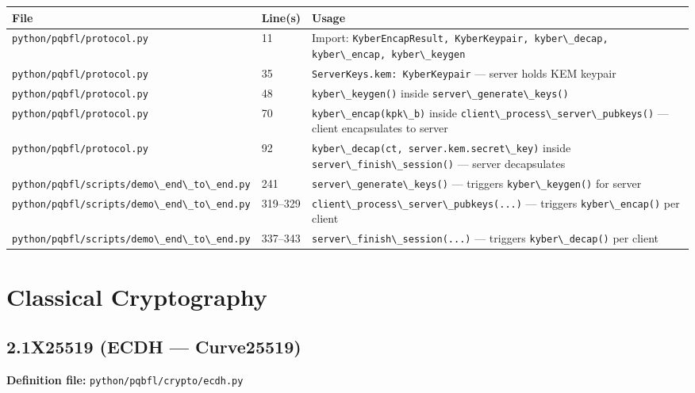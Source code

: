 \documentclass[11pt,a4paper]{article}
\newcommand{\code}[1]{\lstinline[basicstyle=\ttfamily\small]!#1!}
\begin{document}
\begin{longtable}{L{5.5cm} L{1.8cm} L{7cm}}
\toprule
\textbf{File} & \textbf{Line(s)} & \textbf{Usage} \\
\midrule
\endhead
\bottomrule
\endfoot
\code{python/pqbfl/protocol.py}              & 11      & Import: \code{KyberEncapResult, KyberKeypair, kyber\_decap, kyber\_encap, kyber\_keygen} \\
\code{python/pqbfl/protocol.py}              & 35      & \code{ServerKeys.kem: KyberKeypair} --- server holds KEM keypair \\
\code{python/pqbfl/protocol.py}              & 48      & \code{kyber\_keygen()} inside \code{server\_generate\_keys()} \\
\code{python/pqbfl/protocol.py}              & 70      & \code{kyber\_encap(kpk\_b)} inside \code{client\_process\_server\_pubkeys()} --- client encapsulates to server \\
\code{python/pqbfl/protocol.py}              & 92      & \code{kyber\_decap(ct, server.kem.secret\_key)} inside \code{server\_finish\_session()} --- server decapsulates \\
\code{python/pqbfl/scripts/demo\_end\_to\_end.py} & 241     & \code{server\_generate\_keys()} --- triggers \code{kyber\_keygen()} for server \\
\code{python/pqbfl/scripts/demo\_end\_to\_end.py} & 319--329 & \code{client\_process\_server\_pubkeys(...)} --- triggers \code{kyber\_encap()} per client \\
\code{python/pqbfl/scripts/demo\_end\_to\_end.py} & 337--343 & \code{server\_finish\_session(...)} --- triggers \code{kyber\_decap()} per client \\
\end{longtable}

\section{Classical Cryptography}

\subsection{2.1\quad X25519 (ECDH --- Curve25519)}

\textbf{Definition file:} \code{python/pqbfl/crypto/ecdh.py}
\end{document}
